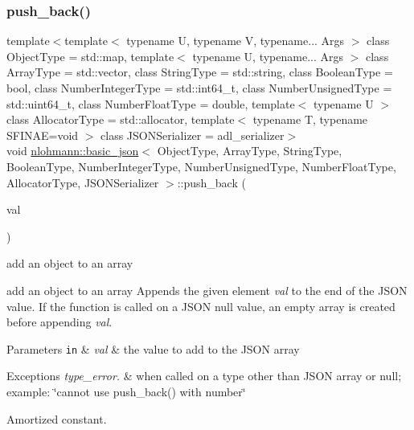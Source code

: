 \subsubsection{\texorpdfstring{push\+\_\+back()}{push\_back()}\hspace{0.1cm}{\footnotesize\ttfamily [2/4]}}
{\footnotesize\ttfamily template$<$template$<$ typename U, typename V, typename... Args $>$ class Object\+Type = std\+::map, template$<$ typename U, typename... Args $>$ class Array\+Type = std\+::vector, class String\+Type  = std\+::string, class Boolean\+Type  = bool, class Number\+Integer\+Type  = std\+::int64\+\_\+t, class Number\+Unsigned\+Type  = std\+::uint64\+\_\+t, class Number\+Float\+Type  = double, template$<$ typename U $>$ class Allocator\+Type = std\+::allocator, template$<$ typename T, typename S\+F\+I\+N\+A\+E=void $>$ class J\+S\+O\+N\+Serializer = adl\+\_\+serializer$>$ \\
void \mbox{\hyperlink{classnlohmann_1_1basic__json}{nlohmann\+::basic\+\_\+json}}$<$ Object\+Type, Array\+Type, String\+Type, Boolean\+Type, Number\+Integer\+Type, Number\+Unsigned\+Type, Number\+Float\+Type, Allocator\+Type, J\+S\+O\+N\+Serializer $>$\+::push\+\_\+back (\begin{DoxyParamCaption}\item[{const \mbox{\hyperlink{classnlohmann_1_1basic__json}{basic\+\_\+json}}$<$ Object\+Type, Array\+Type, String\+Type, Boolean\+Type, Number\+Integer\+Type, Number\+Unsigned\+Type, Number\+Float\+Type, Allocator\+Type, J\+S\+O\+N\+Serializer $>$ \&}]{val }\end{DoxyParamCaption})\hspace{0.3cm}{\ttfamily [inline]}}



add an object to an array 

add an object to an array Appends the given element {\itshape val} to the end of the J\+S\+ON value. If the function is called on a J\+S\+ON null value, an empty array is created before appending {\itshape val}.


\begin{DoxyParams}[1]{Parameters}
\mbox{\tt in}  & {\em val} & the value to add to the J\+S\+ON array\\
\hline
\end{DoxyParams}

\begin{DoxyExceptions}{Exceptions}
{\em type\+\_\+error.} & when called on a type other than J\+S\+ON array or null; example\+: {\ttfamily \char`\"{}cannot use push\+\_\+back() with number\char`\"{}}\\
\hline
\end{DoxyExceptions}
Amortized constant.

